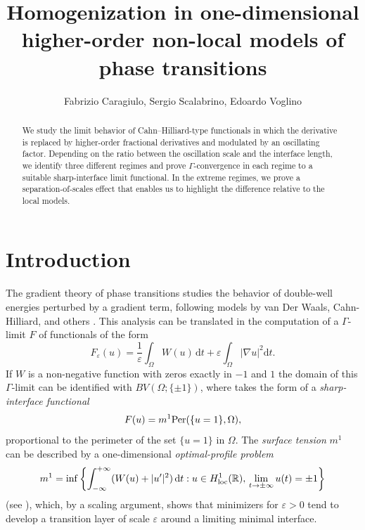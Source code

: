 \documentclass{article}
\title{Homogenization in one-dimensional higher-order non-local models of phase transitions}
\author{Fabrizio Caragiulo, Sergio Scalabrino, Edoardo Voglino}
\date{}
\theoremstyle{definition}
\newcommand{\de}{\mathrm{d}}
\newcommand{\e}{\varepsilon}
\def\e{\varepsilon}
\begin{document}
\maketitle
\begin{abstract}
    We study the limit behavior of Cahn--Hilliard-type functionals in which the derivative is replaced by higher-order fractional derivatives and modulated by an oscillating factor. Depending on the ratio between the oscillation scale and the interface length, we identify three different regimes and prove $\Gamma$-convergence in each regime to a suitable sharp-interface limit functional. In the extreme regimes, we prove a separation-of-scales effect that enables us to highlight the difference relative to the local models.
\end{abstract}


\section{Introduction}

The gradient theory of phase transitions \cite{MR985992, Gurtin, MR1000224, Modica} studies the behavior of double-well energies perturbed by a gradient term, following models by van Der Waals, Cahn-Hilliard, and others \cite{vdW, CH}. This analysis can be translated in the computation of a $\Gamma$-limit $F$ of functionals of the form
\begin{equation*}
F_{\e}(u)= \frac1\e\int_\Omega W(u)\,\de t+\e\int_\Omega|\nabla u|^2\de t.
\end{equation*}
If $W$ is a non-negative function with zeros exactly in $-1$ and $1$ the domain of this $\Gamma$-limit can be identified with $BV(\Omega;\{\pm 1\})$, where takes the form of a {\em sharp-interface functional} 
\[F(u)=m^1 {\rm Per}(\{u=1\},\Omega),\] proportional to the perimeter of the set $\{u=1\}$ in $\Omega$. The {\em surface tension} $m^1$ can be described by a one-dimensional  {\em optimal-profile problem} 
\begin{equation}\label{i1}
m^1= \inf\left\{\int_{-\infty}^{+\infty} (W(u)+|u'|^2)\,\de t: u\in H^1_{\rm loc}(\mathbb R), \,\lim_{t\to \pm \infty} u(t)=\pm1
\right\}
\end{equation}
(see \cite{MR985992}), which, by a scaling argument, shows that minimizers for $\e>0$ tend to develop a transition layer of scale $\e$ around a limiting minimal interface. 
\end{document}
